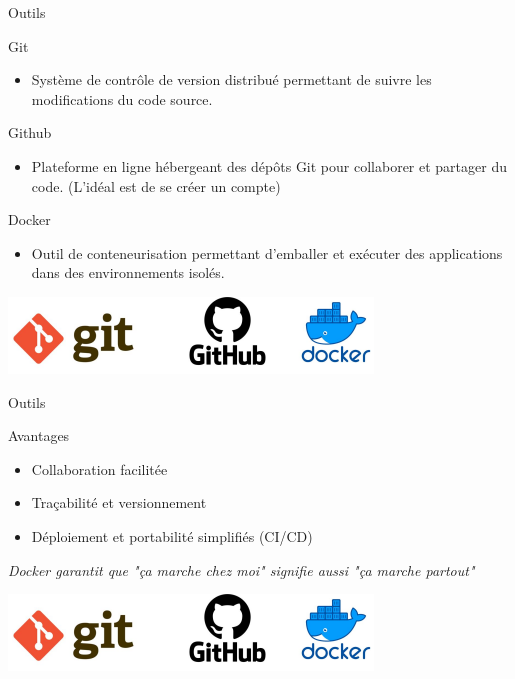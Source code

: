 \documentclass[12pt, handout]{beamer}
\begin{document}
\begin{frame}{Outils}
\begin{block}{Git}
\begin{itemize}
\item Système de contrôle de version distribué permettant de suivre les modifications du code source.
\end{itemize}
\end{block}

\begin{exampleblock}{Github}
\begin{itemize}
\item  Plateforme en ligne hébergeant des dépôts Git pour collaborer et partager du code. (L'idéal est de se créer un compte)
\end{itemize}
\end{exampleblock}

\begin{alertblock}{Docker}
\begin{itemize}
\item Outil de conteneurisation permettant d’emballer et exécuter des applications dans des environnements isolés.
\end{itemize}
\end{alertblock}

\begin{center}
\includegraphics[scale=0.7]{./ressource/logo.png}
\end{center}

\end{frame}


\begin{frame}{Outils}

\begin{block}{Avantages}
\begin{itemize}
\item Collaboration facilitée 
\item Traçabilité et versionnement 
\item Déploiement et portabilité simplifiés  (CI/CD)
\end{itemize}
\end{block}
\textit{Docker garantit que "ça marche chez moi" signifie aussi "ça marche partout"}

\begin{center}
\includegraphics[scale=0.7]{./ressource/logo.png}
\end{center}

\end{frame}
\end{document}
